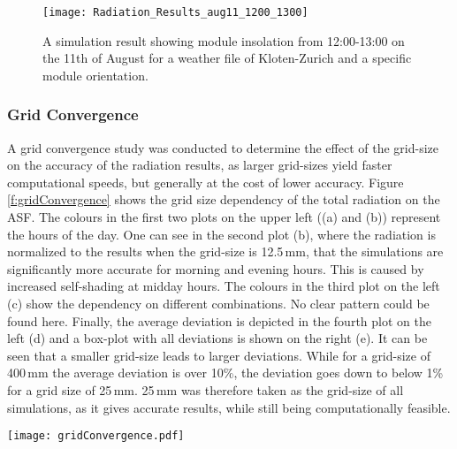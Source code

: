 			\begin{figure}[H]
			\begin{center}
				\texttt{[image: Radiation\_Results\_aug11\_1200\_1300]}
				\caption{A simulation result showing module insolation from 12:00-13:00 on the 11th of August for a weather file of Kloten-Zurich and a specific module orientation.}
				\label{fig:radiation}
			\end{center}
			\end{figure}

			\subsubsection{Grid Convergence}
			\label{ss:gridconvergence}

				A grid convergence study was conducted to determine the effect of the grid-size on the accuracy of the radiation results, as larger grid-sizes yield faster computational speeds, but generally at the cost of lower accuracy. Figure \ref{f:gridConvergence} shows the grid size dependency of the total radiation on the ASF. The colours in the first two plots on the upper left ((a) and (b)) represent the hours of the day. One can see in the second plot (b), where the radiation is normalized to the results when the grid-size is 12.5\,mm, that the simulations are significantly more accurate for morning and evening hours. This is caused by increased self-shading at midday hours. The colours in the third plot on the left (c) show the dependency on different combinations. No clear pattern could be found here. Finally, the average deviation is depicted in the fourth plot on the left (d) and a box-plot with all deviations is shown on the right (e). It can be seen that a smaller grid-size leads to larger deviations. While for a grid-size of 400\,mm the average deviation is over 10\%, the deviation goes down to below 1\% for a grid size of 25\,mm. 25\,mm was therefore taken as the grid-size of all simulations, as it gives accurate results, while still being computationally feasible. 

				\begin{figure*}
					\begin{center}
					\texttt{[image: gridConvergence.pdf]}
					\caption{Grid convergence evaluation, showing the deviations of the radiation in dependence of the grid size, time of the day and panel orientation. (a) shows the total radiation on the panels in dependence of the hour of the day, (b) depicts the same results, but normalized with a division of the results with the smallest grid-size, (c) presents the influence of the panel orientation, (d) plots the average deviation from the smallest grid-size and (e) visualises all deviations with the usage of box-plots.}
					\label{f:gridConvergence}
					\end{center}
				\end{figure*}

